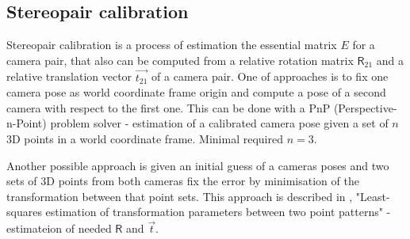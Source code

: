 \subsection{Stereopair calibration}

Stereopair calibration is a process of estimation the essential matrix $E$ for a camera pair, that also can be computed from a relative rotation matrix $\pmb{\mathsf{R}}_{21}$ and a relative translation vector $\vec{t_{21}}$ of a camera pair. One of approaches is to fix one camera  pose as world coordinate frame origin and compute a pose of a second camera with respect to the first one. This can be done with a PnP (Perspective-n-Point) problem solver - estimation of a calibrated camera pose given a set of $n$ 3D points in a world coordinate frame. Minimal required $n=3$. 

Another possible approach is given an initial guess of a cameras poses and two sets of 3D points from both cameras fix the error by minimisation of the transformation between that point sets. This approach is described in \cite{Umeyama1991}, "Least-squares estimation of transformation parameters between two point patterns" - estimateion of needed $\pmb{\mathsf{R}}$ and $\vec{t}$.